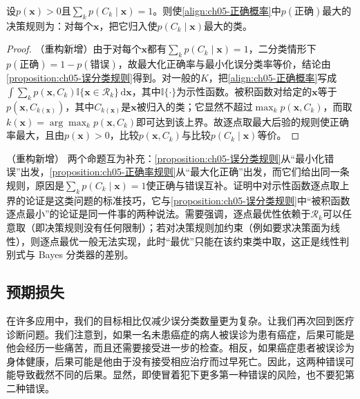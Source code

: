 \documentclass[../../main.tex]{subfiles}
\begin{document}
\begin{proposition}[最大正确率规则]\label{proposition:ch05-正确率规则}
设$p(\boldsymbol{x})>0$且$\sum_k p(C_k\mid\boldsymbol{x})=1$。则使\eqref{align:ch05-正确概率}中$p(\text{正确})$最大的决策规则为：对每个$\boldsymbol{x}$，把它归入使$p(C_k\mid\boldsymbol{x})$最大的类。
\end{proposition}

\begin{proof}
（重构新增）由于对每个$\boldsymbol{x}$都有$\sum_k p(C_k\mid\boldsymbol{x})=1$，二分类情形下$p(\text{正确})=1-p(\text{错误})$，故最大化正确率与最小化误分类率等价，结论由\cref{proposition:ch05-误分类规则}得到。对一般的$K$，把\eqref{align:ch05-正确概率}写成$\int\sum_k p(\boldsymbol{x},C_k)\mathbb{I}\{\boldsymbol{x}\in\mathcal{R}_k\}\,\mathrm{d}\boldsymbol{x}$，其中$\mathbb{I}\{\cdot\}$为示性函数。被积函数对给定的$\boldsymbol{x}$等于$p(\boldsymbol{x},C_{k(\boldsymbol{x})})$，其中$C_{k(\boldsymbol{x})}$是$\boldsymbol{x}$被归入的类；它显然不超过$\max_k p(\boldsymbol{x},C_k)$，而取$k(\boldsymbol{x})=\arg\max_k p(\boldsymbol{x},C_k)$即可达到该上界。故逐点取最大后验的规则使正确率最大，且由$p(\boldsymbol{x})>0$，比较$p(\boldsymbol{x},C_k)$与比较$p(C_k\mid\boldsymbol{x})$等价。
\end{proof}

\begin{remark}（重构新增）
两个命题互为补充：\cref{proposition:ch05-误分类规则}从“最小化错误”出发，\cref{proposition:ch05-正确率规则}从“最大化正确”出发，而它们给出同一条规则，原因是$\sum_k p(C_k\mid\boldsymbol{x})=1$使正确与错误互补。证明中对示性函数逐点取上界的论证是这类问题的标准技巧，它与\cref{proposition:ch05-误分类规则}中“被积函数逐点最小”的论证是同一件事的两种说法。需要强调，逐点最优性依赖于$\mathcal{R}_k$可以任意取（即决策规则没有任何限制）；若对决策规则加约束（例如要求决策面为线性），则逐点最优一般无法实现，此时“最优”只能在该约束类中取，这正是线性判别式与 Bayes 分类器的差别。
\end{remark}

\subsection{预期损失}\label{subsection:ch05-预期损失}

在许多应用中，我们的目标相比仅减少误分类数量更为复杂。让我们再次回到医疗诊断问题。我们注意到，如果一名未患癌症的病人被误诊为患有癌症，后果可能是他会经历一些痛苦，而且还需要接受进一步的检查。相反，如果癌症患者被误诊为身体健康，后果可能是他由于没有接受相应治疗而过早死亡。因此，这两种错误可能导致截然不同的后果。显然，即使冒着犯下更多第一种错误的风险，也不要犯第二种错误。
\end{document}
